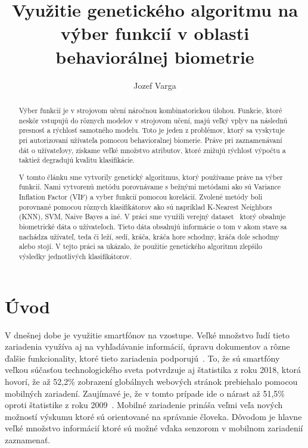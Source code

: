 \documentclass[runningheads]{llncs}
\begin{document}
%
\title{Využitie genetického algoritmu na výber funkcií v oblasti behaviorálnej biometrie}
%
%
\author{Jozef Varga}
%
%
\maketitle              %
%
\begin{abstract}
    Výber funkcií je v strojovom učení náročnou kombinatorickou úlohou. 
    Funkcie, ktoré neskôr vstupujú do rôznych modelov v strojovom učení, majú
    veľký vplyv na následnú presnosť a rýchlosť samotného modelu. Toto je jeden z problémov,
    ktorý sa vyskytuje pri autorizovaní užívateľa pomocou behavioralnej biomerie. Práve pri
    zaznamenávaní dát o užívateľovy, získame veľké množstvo atributov, ktoré znižujú rýchlosť výpočtu
    a taktiež degradujú kvalitu klasifikácie. 
    
    V tomto článku sme vytvorily genetický algoritmus, ktorý používame práve na výber funkcií. Nami vytvorenú
    metódu porovnávame s bežnými metódami ako sú Variance Inflation Factor (VIF) a vyber funkcií pomocou korelácií. 
    Zvolené metódy boli porovnané pomocou rôznych klasifikátorov ako sú napríklad K-Nearest Neighbors (KNN), SVM, Naive Bayes a iné. 
    V práci sme využili verejný dataset~\cite{ref_dataset_anguita,ref_dataset} ktorý obsahuje biometrické dáta o 
    užívateľoch. Tieto dáta obsahujú informácie o tom v akom stave sa nachádza užívateľ, teda či leží, sedí, 
    kráča,  kráča hore schodmy, kráča dole schodmy alebo stojí.
    V tejto práci sa ukázalo, že použitie genetického algoritmu zlepšilo výsledky jednotlivých klasifikátorov.

\end{abstract}
%

\section{Úvod}

V dnešnej dobe je využitie smartfónov na vzostupe. 
Veľké množstvo ľudí tieto zariadenia využíva aj na vyhľadávanie informácií, 
úpravu dokumentov a rôzne ďalšie funkcionality, 
ktoré tieto zariadenia podporujú~\cite{ref_bomhold}. 
To, že sú smartfóny veľkou súčasťou technologického sveta potvrdzuje aj 
štatistika z roku 2018, ktorá hovorí, že až 52,2\% 
zobrazení globálnych webových stránok prebiehalo pomocou mobilných zariadení. 
Zaujímavé je, že v tomto prípade ide o nárast až 51,5\% 
oproti štatistike z roku 2009~\cite{ref_statista19}. Mobilné zariadenie
prináša veľmi veľa nových možností výskumu ktoré sú orientované na správanie človeka.
Dôvodom je hlavne veľké množstvo informácií ktoré sú možné vďaka senzorom v mobilnom 
zariadenií zaznamenať. 
\end{document}
